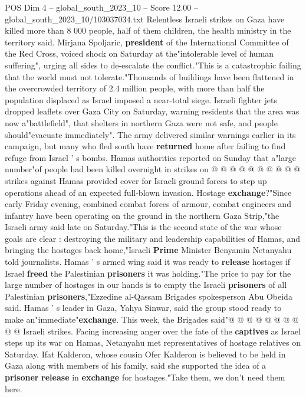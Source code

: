 \begin{textsample}{POS Dim 4 – global\_south\_2023\_10 – Score 12.00 – global\_south\_2023\_10/103037034.txt}  \label{ex:f4_pos_435}
Relentless Israeli strikes on Gaza have killed more than 8 000 people, half of them children, the health ministry in the territory said.
Mirjana Spoljaric, \textbf{president} of the International Committee of the Red Cross, voiced shock on Saturday at the"intolerable level of human suffering", urging all sides to de-escalate the conflict."This is a catastrophic failing that the world must not tolerate."Thousands of buildings have been flattened in the overcrowded territory of 2.4 million people, with more than half the population displaced as Israel imposed a near-total siege.
Israeli fighter jets dropped leaflets over Gaza City on Saturday, warning residents that the area was now a"battlefield", that shelters in northern Gaza were not safe, and people should"evacuate immediately".
The army delivered similar warnings earlier in its campaign, but many who fled south have \textbf{returned} home after failing to find refuge from Israel ' s bombs.
Hamas authorities reported on Sunday that a"large number"of people had been killed overnight in strikes on @ @ @ @ @ @ @ @ @ @ strikes against Hamas provided cover for Israeli ground forces to step up operations ahead of an expected full-blown invasion.
Hostage \textbf{exchange}?"Since early Friday evening, combined combat forces of armour, combat engineers and infantry have been operating on the ground in the northern Gaza Strip,"the Israeli army said late on Saturday."This is the second state of the war whose goals are clear : destroying the military and leadership capabilities of Hamas, and bringing the hostages back home,"Israeli \textbf{Prime} Minister Benyamin Netanyahu told journalists.
Hamas ' s armed wing said it was ready to \textbf{release} hostages if Israel \textbf{freed} the Palestinian \textbf{prisoners} it was holding."The price to pay for the large number of hostages in our hands is to empty the Israeli \textbf{prisoners} of all Palestinian \textbf{prisoners},"Ezzedine al-Qassam Brigades spokesperson Abu Obeida said.
Hamas ' s leader in Gaza, Yahya Sinwar, said the group stood ready to make an"immediate"\textbf{exchange}.
This week, the Brigades said"@ @ @ @ @ @ @ @ @ @ Israeli strikes.
Facing increasing anger over the fate of the \textbf{captives} as Israel steps up its war on Hamas, Netanyahu met representatives of hostage relatives on Saturday.
Ifat Kalderon, whose cousin Ofer Kalderon is believed to be held in Gaza along with members of his family, said she supported the idea of a \textbf{prisoner} \textbf{release} in \textbf{exchange} for hostages."Take them, we don't need them here.

\end{textsample}
